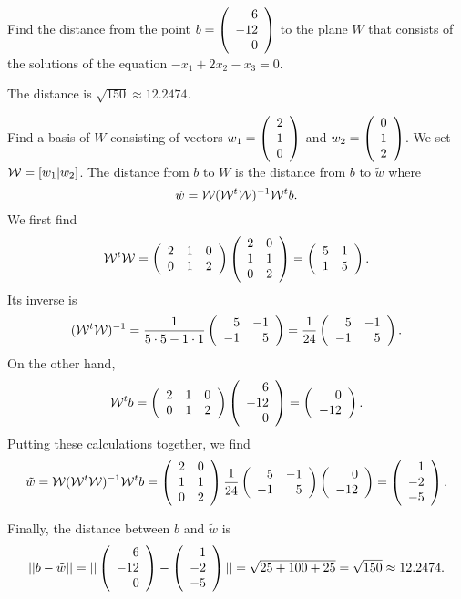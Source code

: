 \documentclass{ximera}
\begin{document}
\begin{exercise} \label{YZ_9.1.7}
Find the distance from the point $b=\Matrix{6\\-12\\0}$ to the plane $W$ that consists of the solutions of the equation $-x_1 + 2x_2 -x_3 =0$.
\begin{solution}

\ans The distance is $\sqrt{150} \approx  12.2474$.

\soln Find a basis of $W$ consisting of vectors $w_1=\Matrix{2\\1\\0}$ and $w_2=\Matrix{0\\1\\2}$. We set $\WW=[w_1|w_2]$. The distance from $b$ to $W$ is the distance from $b$ to $\tilde{w}$ where
\[
\tilde{w}=\WW(\WW^t\WW)^{-1}\WW^tb.
\]
We first find
\[
\WW^t\WW=\Matrix{2&1&0\\0&1&2}\Matrix{2&0\\1&1\\0&2}=\Matrix{5 &1 \\1 &5}.
\]
Its inverse is 
\[
(\WW^t\WW)^{-1}=\frac{1}{5\cdot 5-1\cdot 1}\Matrix{5 &-1\\
-1 &5}=\frac{1}{24}\Matrix{5 &-1\\-1 &5}.
\]
On the other hand,
\[
\WW^tb=\Matrix{2&1&0\\0&1&2}\Matrix{6\\-12\\0}=\Matrix{0\\-12}.
\]
Putting these calculations together, we find 
\[
\tilde{w}=\WW(\WW^t\WW)^{-1}\WW^tb=\Matrix{2&0\\1&1\\0&2}\frac{1}{24}\Matrix{5 &-1\\-1 &5}\Matrix{0\\-12}=\Matrix{1\\-2\\-5}.
\]

Finally, the distance between $b$ and $\tilde{w}$ is 
\[
|| b - \tilde{w} || = ||\Matrix{6\\-12\\0}-\Matrix{1\\-2\\-5}|| = \sqrt{25+ 100 + 25} =\sqrt{150} \approx  12.2474.
\]
\end{solution}

\end{exercise}
\end{document}

